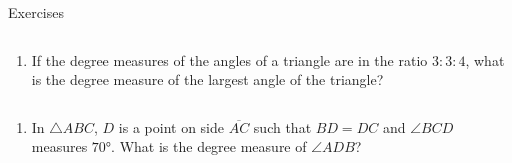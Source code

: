 \documentclass[9pt,aspectratio=169]{beamer}
\begin{document}
\begin{frame}{Exercises}
  \begin{columns}[T]
    \begin{column}{0.5\textwidth}
      \begin{enumerate}
        \item If the degree measures of the angles of a triangle are in the ratio $3:3:4$, what is the degree measure of the largest angle of the triangle? %
        \seti
      \end{enumerate}
      \vspace*{-0.8em}
      \begin{columns}[T, totalwidth=\textwidth]
        \begin{column}{0.65\linewidth}
          \begin{enumerate}
            \conti 
            \item In $\bigtriangleup ABC$, $D$ is a point on side $\overline{AC}$ such that $BD=DC$ and $\angle BCD$ measures $70°$. What is the degree measure of $\angle ADB$?


\end{enumerate}
\end{column}
\end{columns}
\end{column}
\end{columns}
\end{frame}
\end{document}

